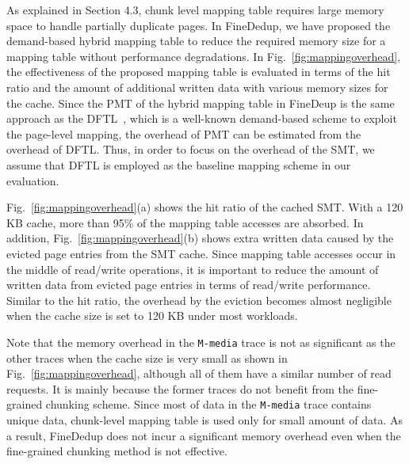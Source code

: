 As explained in Section 4.3,
chunk level mapping table requires large memory space to handle partially duplicate pages.
In FineDedup, we have proposed 
the demand-based hybrid mapping table to reduce the required memory size for a mapping table without performance degradations.
In Fig.~\ref{fig:mappingoverhead}, the effectiveness of the proposed mapping table is evaluated in terms of the hit ratio and 
the amount of additional written data with various memory sizes for the cache.
Since the PMT of the hybrid mapping table in FineDeup is the same approach as the DFTL~\cite{dftl}, which is a well-known 
demand-based scheme to exploit the page-level mapping,
the overhead of PMT can be estimated from the overhead of DFTL.
Thus, in order to focus on the overhead of the SMT, we assume that DFTL is employed as the baseline mapping scheme in our evaluation.

Fig.~\ref{fig:mappingoverhead}(a) shows the hit ratio of the cached SMT. 
With a 120 KB cache, more than 95\% of the mapping table accesses are absorbed.
In addition, Fig.~\ref{fig:mappingoverhead}(b) shows extra written data caused by the evicted page entries 
from the SMT cache.
Since mapping table accesses occur in the middle of read/write operations, it is important to reduce the 
amount of written data from evicted page entries in terms of read/write performance.
Similar to the hit ratio, the overhead by the eviction becomes almost negligible 
when the cache size is set to 120 KB under most workloads.

Note that the memory overhead in the \texttt{M-media} trace is not as significant as the other
traces when the cache size is very small as shown in Fig.~\ref{fig:mappingoverhead},
although all of them have a similar number of read requests.
It is mainly because the former traces do not benefit from the fine-grained chunking scheme.
Since most of data in the \texttt{M-media} trace contains unique data,
chunk-level mapping table is used only for small amount of data.
As a result, FineDedup does not incur a significant memory overhead 
even when the fine-grained chunking method is not effective.

